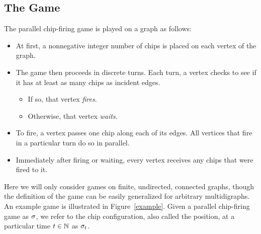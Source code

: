 \subsection*{The Game}
The parallel chip-firing game is played on a graph as follows:
\begin{itemize}
\item At first, a nonnegative integer number of chips is placed on each vertex
  of the graph.
\item The game then proceeds in discrete turns. Each turn, a vertex checks to
  see if it has at least as many chips as incident edges.
\begin{itemize}
\item If so, that vertex \emph{fires}.
\item Otherwise, that vertex \emph{waits}.
\end{itemize}
\item To fire, a vertex passes one chip along each of its edges. All vertices
  that fire in a particular turn do so in parallel.
\item Immediately after firing or waiting, every vertex receives any chips that
  were fired to it.
\end{itemize}
Here we will only consider games on finite, undirected, connected graphs,
though the definition of the game can be easily generalized for arbitrary
multidigraphs. An example game is illustrated in Figure~\ref{example}. Given a
parallel chip-firing game as $\sigma$, we refer to the chip configuration, also
called the position, at a particular time $t \in \mathbb{N}$ as $\sigma_{t}$.
